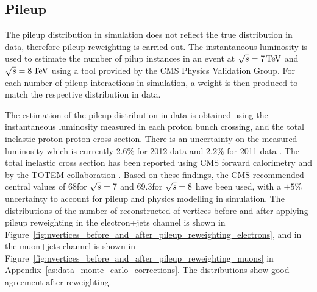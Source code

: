 \subsection{Pileup}
\label{ss:pileup}
The pileup distribution in simulation does not reflect the true distribution in data, therefore pileup
reweighting is carried out. The instantaneous luminosity is used to estimate the number of pilup instances in
an event at $\sqrt{s}=7\,\text{Te\hspace{-.08em}V}$ and $\sqrt{s}=8\,\text{Te\hspace{-.08em}V}$ using a tool provided by the CMS Physics Validation Group.
For each number of pileup interactions in simulation, a weight is then produced to match the respective
distribution in data.

The estimation of the pileup distribution in data is obtained using the instantaneous luminosity measured in
each proton bunch crossing, and the total inelastic proton-proton cross section. There is an uncertainty on
the measured luminosity which is currently 2.6\% for 2012 data \cite{CMS:2013gfa} and 2.2\% for 2011 data
\cite{CMS:2012eui}. The total inelastic cross section has been reported using CMS forward calorimetry
\cite{Chatrchyan:2012gwa} and by the TOTEM collaboration \cite{Antchev:2011vs}. Based on these findings, the
CMS recommended central values of 68\mb for $\sqrt{s}=7$ and 69.3\mb for $\sqrt{s}=8$ have been used, with a
$\pm5\%$ uncertainty to account for pileup and physics modelling in simulation. The distributions of the
number of reconstructed of vertices before and after applying pileup reweighting in the electron+jets channel
is shown in Figure~\ref{fig:nvertices_before_and_after_pileup_reweighting_electrons}, and in the muon+jets
channel is shown in Figure~\ref{fig:nvertices_before_and_after_pileup_reweighting_muons} in Appendix~\ref{as:data_monte_carlo_corrections}.
The distributions show good agreement after reweighting.


